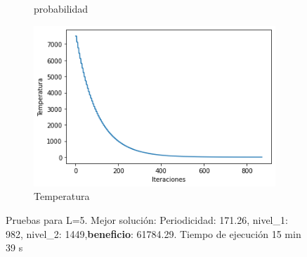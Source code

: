 \documentclass[a4paper,12pt]{article}
\begin{document}
\begin{figure}[H]
\begin{subfigure}{0.24\textwidth}
			\caption{probabilidad}
		\end{subfigure}
		\hfill
		\begin{subfigure}{0.24\textwidth}
			\centering
			\includegraphics[width=\textwidth]{include/L5/temperatura.png}
			\caption{Temperatura}
		\end{subfigure}
		\caption{Pruebas para L=5. Mejor solución: Periodicidad: 171.26, nivel\_1: 982,  nivel\_2: 1449,\textbf{beneficio}: 61784.29. Tiempo de ejecución 15 min 39 s}
	\end{figure}
\end{document}
